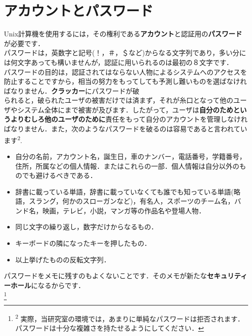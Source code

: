 \documentclass[main]{subfiles}
\begin{document}
\vspace{30pt}
\chapter{アカウントとパスワード}

\fontsize{10}{15} \selectfont
Unix計算機を使用するには，その権利である\textbf{アカウント}と認証用の\textbf{パスワード}が必要です．\\
\indent
パスワードは，英数字と記号(！，＃，＄など)からなる文字列であり，多い分には何文字あっても構いませんが，認証に用いられるのは最初の８文字です．\\
\indent
パスワードの目的は，認証されてはならない人物によるシステムへのアクセスを防止することですから，相当の努力をもってしても予測し難いものを選ばなければなりません．\textbf{クラッカー}にパスワードが破\\

\fontsize{10.2}{15} \selectfont
\noindent
られると，破られたユーザの被害だけでは済まず，それが糸口となって他のユーザやシステム全体にまで被害が及びます．したがって，ユーザは\textbf{自分のためというよりむしろ他のユーザのために}責任をもって自分のアカウントを管理しなければなりません．また，次のようなパスワードを破るのは容易であると言われています\textsuperscript{2}.\\

\begin{itemize}
    \setlength{\itemsep}{0.7zw}         %
    \item 自分の名前，アカウント名，誕生日，車のナンバー，電話番号，学籍番号，住所，所属などの個人情報．またはこれらの一部．個人情報は自分以外のものでも避けるべきである．
    \item 辞書に載っている単語，辞書に載っていなくても誰でも知っている単語(略語，スラング，何かのスローガンなど)，有名人，スポーツのチーム名，バンド名，映画，テレビ，小説，マンガ等の作品名や登場人物．
    \item 同じ文字の繰り返し，数字だけからなるもの．
    \item キーボードの隣になったキーを押したもの．
    \item 以上挙げたものの反転文字列．
\end{itemize}

パスワードをメモに残すのもよくないことです．そのメモが新たな\textbf{セキュリティーホール}になるからです．\\

\footnote{\textsuperscript{2} 実際，当研究室の環境では，あまりに単純なパスワードは拒否されます．パスワードは十分な複雑さを持たせるようにしてください．}
\end{document}
